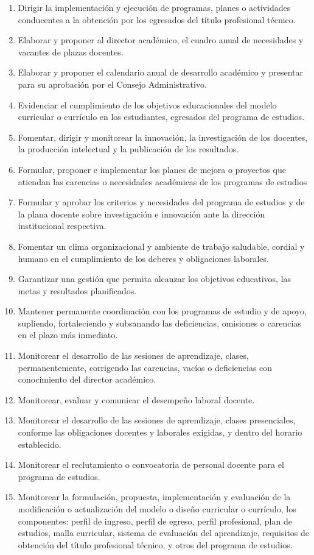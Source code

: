 \begin{enumerate}
\item Dirigir la implementación y ejecución de programas, planes o actividades conducentes a la obtención por los egresados del título profesional técnico. 
\item Elaborar y proponer al director académico, el cuadro anual de necesidades y vacantes de plazas docentes. 
\item Elaborar y proponer el calendario anual de desarrollo académico  y presentar para su aprobación por el Consejo Administrativo. 
\item Evidenciar el cumplimiento de los objetivos educacionales del modelo curricular o currículo en los estudiantes, egresados del programa de estudios. 
\item Fomentar, dirigir y monitorear la innovación, la investigación de los docentes, la producción intelectual y la publicación de los resultados. 
\item Formular, proponer e implementar los planes de mejora o proyectos que atiendan las carencias o necesidades académicas de los programas de estudios 
\item Formular y aprobar los criterios y necesidades del programa de estudios y de la plana docente sobre investigación e innovación ante la dirección institucional respectiva. 
\item Fomentar un clima organizacional y ambiente de trabajo saludable, cordial y humano en el cumplimiento de los deberes y obligaciones laborales. 
\item Garantizar una gestión que permita alcanzar los objetivos educativos, las metas y resultados planificados. 
\item Mantener permanente coordinación con los programas de estudio y de apoyo, supliendo, fortaleciendo y subsanando las deficiencias, omisiones o carencias en el plazo más inmediato. 
\item Monitorear el desarrollo de las sesiones de aprendizaje, clases, permanentemente, corrigendo las carencias, vacíos o deficiencias con conocimiento del director académico.
\item Monitorear, evaluar y comunicar el desempeño laboral docente. 
\item Monitorear el desarrollo de las sesiones de aprendizaje, clases presenciales, conforme las obligaciones docentes y laborales exigidas, y dentro del horario establecido. 
\item Monitorear el reclutamiento o convocatoria de personal docente para el programa de estudios. 
\item Monitorear la formulación, propuesta, implementación y evaluación de la modificación o actualización del modelo o diseño curricular o currículo, los componentes: perfil de ingreso, perfil de egreso, perfil profesional, plan de estudios, malla curricular, sistema de evaluación del aprendizaje, requisitos de obtención del título profesional técnico, y otros del programa de estudios. 

\end{enumerate}
